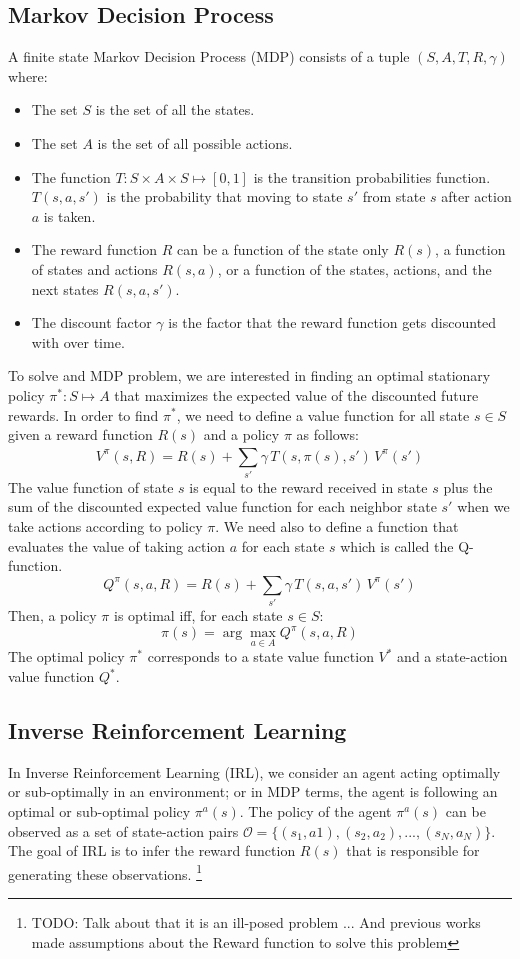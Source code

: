 \documentclass[conference]{IEEEtran}
\begin{document}
\subsection{Markov Decision Process}
A finite state Markov Decision Process (MDP) \cite{puterman2014markov} consists of a tuple $(S,A,T,R,\gamma)$ where:
\begin{itemize}
    \item The set $S$ is the set of all the states.
    \item The set $A$ is the set of all possible actions.
    \item The function $T : S\times A\times S \mapsto [0,1]$ is the transition probabilities function. $T(s,a,s')$ is the probability that moving to state $s'$ from state $s$ after action $a$ is taken.
    \item The reward function $R$ can be a function of the state only $R(s)$, a function of states and actions $R(s,a)$, or a function of the states, actions, and the next states $R(s,a,s')$.
    \item The discount factor $\gamma$ is the factor that the reward function gets discounted with over time.
\end{itemize}
To solve and MDP problem, we are interested in finding an optimal stationary policy $\pi^*: S \mapsto A$ that maximizes the expected value of the discounted future rewards.
In order to find $\pi^*$, we need to define a value function for all state $s \in S$ given a reward function $R(s)$ and a policy $\pi$ as follows:
\[ V^\pi(s,R) = R(s) + \sum_{s'}^{}\gamma\,T(s,\pi(s),s')\,V^\pi(s') \]
The value function of state $s$ is equal to the reward received in state $s$ plus the sum of the discounted expected value function for each neighbor state $s'$ when we take actions according to policy $\pi$.
We need also to define a function that evaluates the value of taking action $a$ for each state $s$ which is called the Q-function.
\[Q^\pi(s,a,R) = R(s) + \sum_{s'}{} \gamma\,T(s,a,s')\,V^\pi(s') \]
Then, a policy $\pi$ is optimal iff, for each state $s \in S$:
\[ \pi(s) = \arg\!\max_{a\in A} Q^\pi(s,a,R)\]
The optimal policy $\pi^*$ corresponds to a state value function $V^*$ and a state-action value function $Q^*$.

\subsection{Inverse Reinforcement Learning}
In Inverse Reinforcement Learning (IRL), we consider an agent acting optimally or sub-optimally in an environment; or in MDP terms, the agent is following an optimal or sub-optimal policy $\pi^a(s)$. The policy of the agent $\pi^a(s)$ can be observed as a set of state-action pairs $\mathcal{O} = \{(s_1,a1),(s_2,a_2), ...,(s_N,a_N)\}$. The goal of IRL is to infer the reward function $R(s)$ that is responsible for generating these observations.
\footnote{TODO: Talk about that it is an ill-posed problem ... And previous works made assumptions about the Reward function to solve this problem}
\end{document}
